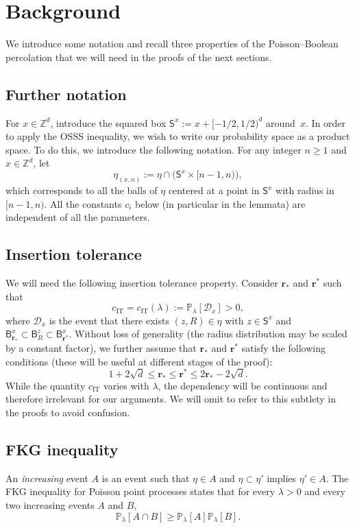 \documentclass[10pt]{amsart}
\theoremstyle{definition}\newtheorem{defi}[theo]{Definition}\newtheorem{rema}[theo]{Remark}\newtheorem{exam}[theo]{Example}\newtheorem{exem}[theo]{Example}\newtheorem{nota}[theo]{Notation}
\newcommand{\rbf}{\mathbf{r}}
\DeclareMathOperator{\IT}{IT}
\begin{document}
\section{Background}\label{sect2}
We introduce some notation and recall three properties of the Poisson--Boolean percolation that we will need in the proofs of the next sections.
\subsection{Further notation}
For $x\in {\mathbb Z}^d$, introduce the squared box $\mathsf S^{x}:= x+[-1/2,1/2)^d$ around~$x$. In order to apply the OSSS inequality, we wish to write our probability space as a product space. To do this, we introduce the following notation. For any integer $n\ge1$ and $x\in {\mathbb Z}^d$, let
\[
\eta_{(x,n)} := \eta\cap \big(\mathsf S^x\times [n-1,n)\big),
\]
which corresponds to all the balls of $\eta$ centered at a point in $\mathsf S^x$ with radius in $[n-1,n)$. All the constants $c_i$ below (in particular in the lemmata) are independent of all the parameters.



\subsection{Insertion tolerance}
We will need the following insertion tolerance property. Consider ${\rbf_*}$ and ${\rbf^*}$ such that
\begin{equation}\label{eq:radass}
\tag{IT}
c_{\IT}=c_{\IT}(\lambda):={\mathbb P}_\lambda[{\mathcal D}_x]>0,
\end{equation}
where ${\mathcal D}_x$ is the event that there exists $(z,R)\in \eta$ with $z\in\mathsf S^x$ and $\mathsf B_{\rbf_*}^x\subset \mathsf B_R^z\subset \mathsf B_{\rbf^*}^x$. Without loss of generality (the radius distribution may be scaled by a constant factor), we further assume that ${\rbf_*}$ and ${\rbf^*}$ satisfy the following conditions (these will be useful at different stages of the proof):
\begin{equation}\label{eq:rass}
1+2\sqrt d\le {\rbf_*}\le{\rbf^*}\le 2{\rbf_*}-2\sqrt d.
\end{equation}
While the quantity $c_{\IT}$ varies with $\lambda$, the dependency will be continuous and therefore irrelevant for our arguments. We will omit to refer to this subtlety in the proofs to avoid confusion.
\subsection{FKG inequality}
An \emph{increasing} event $A$ is an event such that $\eta\in A$ and $\eta\subset\eta'$ implies $\eta'\in A$. The FKG inequality for Poisson point processes states that for every $\lambda>0$ and every two increasing events $A$ and $B$,
\begin{equation}\label{eq:FKG}
\tag{FKG}
{\mathbb P}_\lambda[A\cap B]\ge {\mathbb P}_\lambda[A]{\mathbb P}_\lambda[B].
\end{equation}
\end{document}
